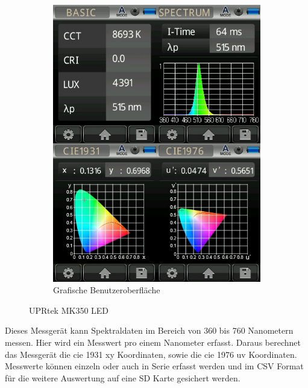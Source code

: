 \documentclass[11pt]{scrartcl}
\begin{document}
\begin{figure}[H]
\begin{subfigure}[b]{0.49\textwidth}
        \includegraphics[width=\textwidth]{images/mk350_lightcan_green.JPG}
        \caption{Grafische Benutzeroberfläche}
    \end{subfigure}
    \caption{UPRtek MK350 LED}
\end{figure}
\noindent
Dieses Messgerät kann Spektraldaten im Bereich von 360 bis 760 Nanometern messen. Hier wird ein Messwert pro einem Nanometer erfasst. Daraus berechnet
das Messgerät die \ac{cie} 1931 xy Koordinaten, sowie die \ac{cie} 1976 uv Koordinaten. Messwerte können einzeln oder auch in Serie erfasst werden und
im CSV Format für die weitere Auswertung auf eine SD Karte gesichert werden.
\clearpage

\end{document}

